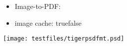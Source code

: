 \documentclass[luatex]{article}%
\begin{document}
\begin{itemize}
\makeatletter
\item Image-to-PDF: \@gfxmagic@imagetopdf

\item image cache: \if@gfxmagic@imagecache true\else false\fi
\makeatother
\end{itemize}

\texttt{[image: testfiles/tigerpsdfmt.psd]}
\end{document}
